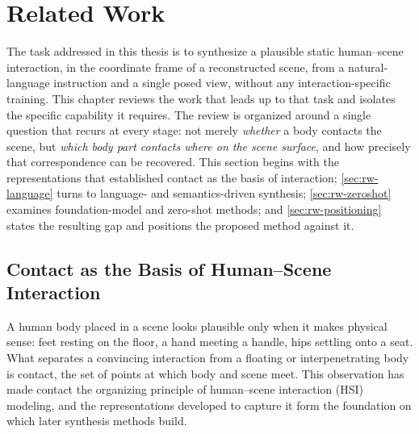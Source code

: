 \chapter{Related Work}
\label{chap:related-work}

The task addressed in this thesis is to synthesize a plausible static human--scene interaction, in the coordinate frame of a reconstructed scene, from a natural-language instruction and a single posed view, without any interaction-specific training. This chapter reviews the work that leads up to that task and isolates the specific capability it requires. The review is organized around a single question that recurs at every stage: not merely \emph{whether} a body contacts the scene, but \emph{which body part contacts where on the scene surface}, and how precisely that correspondence can be recovered. This section begins with the representations that established contact as the basis of interaction; \cref{sec:rw-language} turns to language- and semantics-driven synthesis; \cref{sec:rw-zeroshot} examines foundation-model and zero-shot methods; and \cref{sec:rw-positioning} states the resulting gap and positions the proposed method against it.

\section{Contact as the Basis of Human--Scene Interaction}
\label{sec:rw-contact}

A human body placed in a scene looks plausible only when it makes physical sense: feet resting on the floor, a hand meeting a handle, hips settling onto a seat. What separates a convincing interaction from a floating or interpenetrating body is contact, the set of points at which body and scene meet. This observation has made contact the organizing principle of human--scene interaction (HSI) modeling, and the representations developed to capture it form the foundation on which later synthesis methods build.

